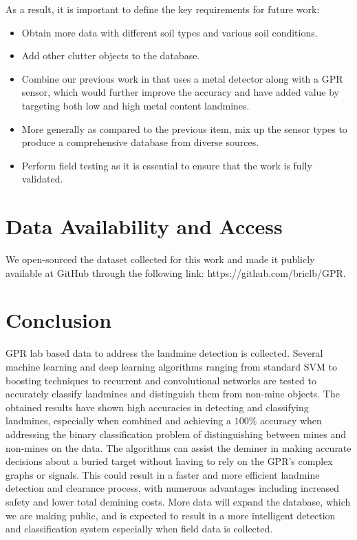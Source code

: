 \documentclass{ieeeaccess}
\begin{document}
As a result, it is important to define the key requirements for future work:
\begin{itemize}
    \item Obtain more data with different soil types and various soil conditions.
    \item Add other clutter objects to the database.
    \item Combine our previous work in \cite{Safatly2020} that uses a metal detector along with a GPR sensor, which would further improve the accuracy and have added value by targeting both low and high metal content landmines.
    \item More generally as compared to the previous item, mix up the sensor types to produce a comprehensive database from diverse sources.
    \item Perform field testing as it is essential to ensure that the work is fully validated.
\end{itemize}



\section{Data Availability and Access}
We open-sourced the dataset collected for this work and made it publicly available at GitHub through the following link: https://github.com/briclb/GPR.



\section{Conclusion}
GPR lab based data to address the landmine detection is collected.  Several machine learning and deep learning algorithms ranging from standard SVM to boosting techniques to recurrent and convolutional networks are tested to accurately classify landmines and distinguish them from non-mine objects. The obtained results have shown high accuracies in detecting and classifying landmines, especially when combined and achieving a $100\%$ accuracy when addressing the binary classification problem of distinguishing between mines and non-mines on the data. The algorithms can assist the deminer in making accurate decisions about a buried target without having to rely on the GPR's complex graphs or signals. This could result in a faster and more efficient landmine detection and clearance process, with numerous advantages including increased safety and lower total demining costs. More data will expand the database, which we are making public, and is expected to result in a more intelligent detection and classification system especially when field data is collected.
\end{document}
